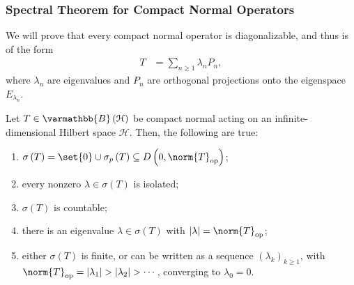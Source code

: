 \documentclass[10pt]{mypackage}
\renewcommand*{\mathbb}[1]{\varmathbb{#1}}
\newcommand{\B}{\mathbb{B}}
\begin{document}
\subsubsection{Spectral Theorem for Compact Normal Operators}%
We will prove that every compact normal operator is diagonalizable, and thus is of the form
\begin{align*}
  T &= \sum_{n\geq 1}\lambda_nP_n,
\end{align*}
where $\lambda_n$ are eigenvalues and $P_n$ are orthogonal projections onto the eigenspace $E_{\lambda_n}$.
\begin{theorem}
  Let $T\in \B\left(\mathcal{H}\right)$ be compact normal acting on an infinite-dimensional Hilbert space $\mathcal{H}$. Then, the following are true:
  \begin{enumerate}[(1)]
    \item $\sigma\left(T\right) = \set{0}\cup \sigma_p\left(T\right)\subseteq D\left(0,\norm{T}_{\text{op}}\right)$;
    \item every nonzero $\lambda\in \sigma\left(T\right)$ is isolated;
    \item $\sigma\left(T\right)$ is countable;
    \item there is an eigenvalue $\lambda\in \sigma\left(T\right)$ with $\left\vert \lambda \right\vert = \norm{T}_{\text{op}}$;
    \item either $\sigma\left(T\right)$ is finite, or can be written as a sequence $\left(\lambda_k\right)_{k\geq 1}$, with $\norm{T}_{\text{op}} = \left\vert \lambda_1 \right\vert > \left\vert \lambda_2 \right\vert > \cdots$, converging to $\lambda_0 = 0$.
  \end{enumerate}
\end{theorem}
\end{document}
